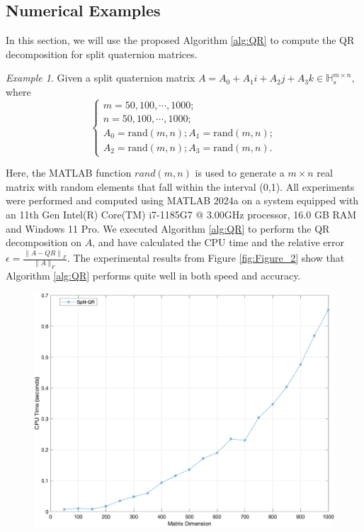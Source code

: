 \documentclass{book}
\theoremstyle{remark}
\newtheorem{example}{\it\indent Example}[section]
\begin{document}
\begin{multicols}{2}
\section{Numerical Examples}

In this section, we will use the proposed Algorithm \ref{alg:QR} to compute the QR decomposition for split quaternion matrices.
\begin{example}
    Given a split quaternion matrix $A = A_{0}+A_{1}i+A_{2}j+A_{3}k\in \mathbb{H}_s^{m\times n}$, where
    \begin{equation}
       \begin{cases}
            m = 50,100,\cdots,1000;\\
            n = 50,100,\cdots,1000;  \\
            A_{0}=\text{rand}(m,n);
            A_{1}=\text{rand}(m,n); \\
            A_{2}=\text{rand}(m,n);
            A_{3}=\text{rand}(m,n).
        \end{cases} \label{eq:example2}
    \end{equation}
\end{example}
Here, the MATLAB function $rand(m,n)$ is used to generate a $m \times n$ real matrix with random elements that fall within the interval (0,1).  All experiments were performed and computed using MATLAB 2024a on a system equipped with an 11th Gen Intel(R) Core(TM) i7-1185G7 @ 3.00GHz processor, 16.0 GB RAM and Windows 11 Pro. We executed Algorithm \ref{alg:QR} to perform the QR decomposition on $A$, and have calculated the CPU time and the relative error
$\epsilon = \frac{\left\|A - Q R\right\|_{F}}{\|A\|_{F}}.$
The experimental results from Figure \ref{fig:Figure_2} show that Algorithm \ref{alg:QR} performs quite well in both speed and accuracy. 
\begin{figure}[H]
    \centering
    \begin{minipage}[b]{0.45\textwidth}
        \centering
        \includegraphics[width=\textwidth]{Figure_2.png} %

\end{minipage}
\end{figure}
\end{multicols}
\end{document}
